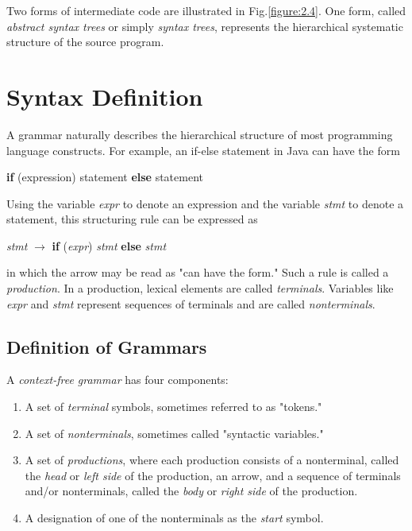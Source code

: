 \documentclass[a4paper,twoside]{book}
\begin{document}
Two forms of intermediate code are illustrated in Fig.\;\ref{figure:2.4}. One form, called \textit{abstract syntax trees} or simply \textit{syntax trees}, represents the hierarchical systematic structure of the source program.

\section{Syntax Definition}

A grammar naturally describes the hierarchical structure of most programming language constructs. For example, an if-else statement in Java can have the form
\begin{center}
    \textbf{if} (expression) statement \textbf{else} statement
\end{center}

Using the variable \textit{expr} to denote an expression and the variable \textit{stmt} to denote a statement, this structuring rule can be expressed as
\begin{center}
    \textit{stmt} $\rightarrow$ \textbf{if} (\textit{expr}) \textit{stmt} \textbf{else} \textit{stmt}
\end{center}
in which the arrow may be read as "can have the form." Such a rule is called a \textit{production}. In a production, lexical elements are called \textit{terminals}. Variables like \textit{expr} and \textit{stmt} represent sequences of terminals and are called \textit{nonterminals}.

\subsection{Definition of Grammars}

A \textit{context-free grammar} has four components:
\begin{enumerate}
    \item A set of \textit{terminal} symbols, sometimes referred to as "tokens."
    \item A set of \textit{nonterminals}, sometimes called "syntactic variables."
    \item A set of \textit{productions}, where each production consists of a nonterminal, called the \textit{head} or \textit{left side} of the production, an arrow, and a sequence of terminals and/or nonterminals, called the \textit{body} or \textit{right side} of the production.
    \item A designation of one of the nonterminals as the \textit{start} symbol.
\end{enumerate}
\end{document}
